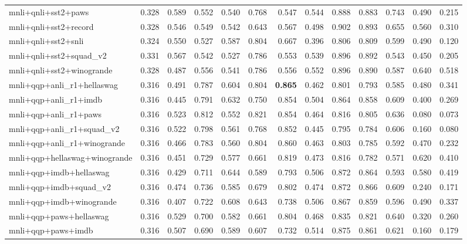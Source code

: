 \begin{table}[t]
\begin{tabular}{lrrrrrrrrrrrr}
    mnli+qnli+sst2+paws & 0.328 & 0.589 & 0.552 & 0.540 & 0.768 & 0.547 & 0.544 & 0.888 & 0.883 & 0.743 & 0.490 & 0.215 \\
    mnli+qnli+sst2+record & 0.328 & 0.546 & 0.549 & 0.542 & 0.643 & 0.567 & 0.498 & 0.902 & 0.893 & 0.655 & 0.560 & 0.310 \\
    mnli+qnli+sst2+snli & 0.324 & 0.550 & 0.527 & 0.587 & 0.804 & 0.667 & 0.396 & 0.806 & 0.809 & 0.599 & 0.490 & 0.120 \\
    mnli+qnli+sst2+squad\_v2 & 0.331 & 0.567 & 0.542 & 0.527 & 0.786 & 0.553 & 0.539 & 0.896 & 0.892 & 0.543 & 0.450 & 0.205 \\
    mnli+qnli+sst2+winogrande & 0.328 & 0.487 & 0.556 & 0.541 & 0.786 & 0.556 & 0.552 & 0.896 & 0.890 & 0.587 & 0.640 & 0.518 \\
    mnli+qqp+anli\_r1+hellaswag & 0.316 & 0.491 & 0.787 & 0.604 & 0.804 & \textbf{0.865} & 0.462 & 0.801 & 0.793 & 0.585 & 0.480 & 0.341 \\
    mnli+qqp+anli\_r1+imdb & 0.316 & 0.445 & 0.791 & 0.632 & 0.750 & 0.854 & 0.504 & 0.864 & 0.858 & 0.609 & 0.400 & 0.269 \\
    mnli+qqp+anli\_r1+paws & 0.316 & 0.523 & 0.812 & 0.552 & 0.821 & 0.854 & 0.464 & 0.816 & 0.805 & 0.636 & 0.080 & 0.073 \\
    mnli+qqp+anli\_r1+squad\_v2 & 0.316 & 0.522 & 0.798 & 0.561 & 0.768 & 0.852 & 0.445 & 0.795 & 0.784 & 0.606 & 0.160 & 0.080 \\
    mnli+qqp+anli\_r1+winogrande & 0.316 & 0.466 & 0.783 & 0.560 & 0.804 & 0.860 & 0.463 & 0.803 & 0.785 & 0.592 & 0.470 & 0.232 \\
    mnli+qqp+hellaswag+winogrande & 0.316 & 0.451 & 0.729 & 0.577 & 0.661 & 0.819 & 0.473 & 0.816 & 0.782 & 0.571 & 0.620 & 0.410 \\
    mnli+qqp+imdb+hellaswag & 0.316 & 0.429 & 0.711 & 0.644 & 0.589 & 0.793 & 0.506 & 0.872 & 0.864 & 0.593 & 0.580 & 0.419 \\
    mnli+qqp+imdb+squad\_v2 & 0.316 & 0.474 & 0.736 & 0.585 & 0.679 & 0.802 & 0.474 & 0.872 & 0.866 & 0.609 & 0.240 & 0.171 \\
    mnli+qqp+imdb+winogrande & 0.316 & 0.407 & 0.722 & 0.608 & 0.643 & 0.738 & 0.506 & 0.867 & 0.859 & 0.596 & 0.490 & 0.337 \\
    mnli+qqp+paws+hellaswag & 0.316 & 0.529 & 0.700 & 0.582 & 0.661 & 0.804 & 0.468 & 0.835 & 0.821 & 0.640 & 0.320 & 0.260 \\
    mnli+qqp+paws+imdb & 0.316 & 0.507 & 0.690 & 0.589 & 0.607 & 0.732 & 0.514 & 0.875 & 0.861 & 0.621 & 0.160 & 0.179 \\

\end{tabular}
\end{table}

